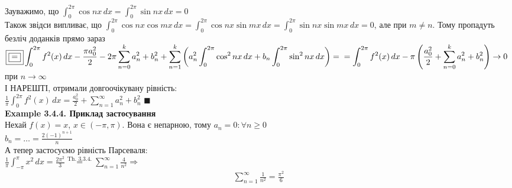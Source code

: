 \documentclass[a4paper, 14pt]{extarticle}
\def\hugespace{\vspace{5mm} \\}
\begin{document}
Зауважимо, що $\displaystyle \int_0^{2\pi} \cos nx \,dx = \int_0^{2\pi} \sin nx \,dx = 0$\\
Також звідси випливає, що $\displaystyle \int_0^{2\pi} \cos nx \cos mx \,dx = \int_0^{2\pi} \cos nx \sin mx \,dx = \int_0^{2\pi} \sin nx \sin mx \,dx = 0$, але при $m \neq n$. Тому пропадуть безліч доданків прямо зараз\\
$\displaystyle \boxed{\boxed{=}} \int_0^{2\pi} f^2(x)\,dx -\frac{\pi a_0^2}{2} - 2\pi \sum_{n=0}^k a_n^2 + b_n^2 + \sum_{n=1}^k \left(a_n^2 \int_0^{2\pi} \cos^2 nx \,dx + b_n \int_0^{2\pi} \sin^2 nx \,dx  \right) = \\
= \int_0^{2\pi} f^2(x)\,dx - \pi \left(\frac{a^2_0}{2} + \sum_{n=0}^k a_n^2 + b_n^2 \right) \to 0$ при $n \to \infty$\\
І НАРЕШТІ, отримали довгоочікувану рівність:\\
$\displaystyle \frac{1}{\pi} \int_{0}^{2\pi} f^2(x)\,dx = \frac{a_0^2}{2} + \sum_{n=1}^{\infty} a_n^2 + b_n^2$ $\blacksquare$
\hugespace
\textbf{Example 3.4.4. Приклад застосування}\\
Нехай $f(x) = x$, $x \in (-\pi, \pi)$. Вона є непарною, тому $a_n = 0: \forall n \geq 0$\\
$\displaystyle b_n = \dots = \frac{2(-1)^{n+1}}{n}$\\
А тепер застосуємо рівність Парсеваля:\\
$\displaystyle \frac{1}{\pi} \int_{-\pi}^{\pi} x^2\,dx = \frac{2\pi^2}{3} \overset{\textrm{Th. 3.3.4.}}{=} \sum_{n=1}^{\infty} \frac{4}{n^2} \Rightarrow$
\begin{align*}
\sum_{n=1}^{\infty} \frac{1}{n^2} = \frac{\pi^2}{6}
\end{align*}
\hugespace
\end{document}
